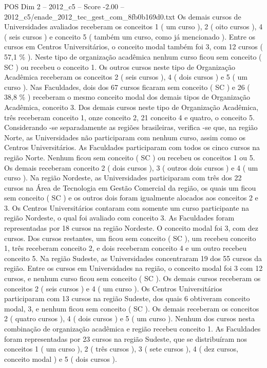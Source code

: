 \begin{textsample}{POS Dim 2 – 2012\_c5 – Score -2.00 – 2012\_c5/enade\_2012\_tec\_gest\_com\_8fb0b169d0.txt}
Os demais cursos de Universidades avaliados receberam os conceitos 1 ( um curso ), 2 ( oito cursos ), 4 ( seis cursos ) e conceito 5 ( também um curso, como já mencionado ).
Entre os cursos em Centros Universitários, o conceito modal também foi 3, com 12 cursos ( 57,1 \% ).
Neste tipo de organização acadêmica nenhum curso ficou sem conceito ( SC ) ou recebeu o conceito 1.
Os outros cursos neste tipo de Organização Acadêmica receberam os conceitos 2 ( seis cursos ), 4 ( dois cursos ) e 5 ( um curso ).
Nas Faculdades, dois dos 67 cursos ficaram sem conceito ( SC ) e 26 ( 38,8 \% ) receberam o mesmo conceito modal dos demais tipos de Organização Acadêmica, conceito 3.
Dos demais cursos neste tipo de Organização Acadêmica, três receberam conceito 1, onze conceito 2, 21 conceito 4 e quatro, o conceito 5.
Considerando -se separadamente as regiões brasileiras, verifica -se que, na região Norte, as Universidades não participaram com nenhum curso, assim como os Centros Universitários.
As Faculdades participaram com todos os cinco cursos na região Norte.
Nenhum ficou sem conceito ( SC ) ou recebeu os conceitos 1 ou 5.
Os demais receberam conceito 2 ( dois cursos ), 3 ( outros dois cursos ) e 4 ( um curso ).
Na região Nordeste, as Universidades participaram com três dos 22 cursos na Área de Tecnologia em Gestão Comercial da região, os quais um ficou sem conceito ( SC ) e os outros dois foram igualmente alocados aos conceitos 2 e 3.
Os Centros Universitários contaram com somente um curso participante na região Nordeste, o qual foi avaliado com conceito 3.
As Faculdades foram representadas por 18 cursos na região Nordeste.
O conceito modal foi 3, com dez cursos.
Dos cursos restantes, um ficou sem conceito ( SC ), um recebeu conceito 1, três receberam conceito 2, e dois receberam conceito 4 e um outro recebeu conceito 5.
Na região Sudeste, as Universidades concentraram 19 dos 55 cursos da região.
Entre os cursos em Universidades na região, o conceito modal foi 3 com 12 cursos, e nenhum curso ficou sem conceito ( SC ).
Os demais cursos receberam os conceitos 2 ( seis cursos ) e 4 ( um curso ).
Os Centros Universitários participaram com 13 cursos na região Sudeste, dos quais 6 obtiveram conceito modal, 3, e nenhum ficou sem conceito ( SC ).
Os demais receberam os conceitos 2 ( quatro cursos ), 4 ( dois cursos ) e 5 ( um curso ).
Nenhum dos cursos nesta combinação de organização acadêmica e região recebeu conceito 1.
As Faculdades foram representadas por 23 cursos na região Sudeste, que se distribuíram nos conceitos 1 ( um curso ), 2 ( três cursos ), 3 ( sete cursos ), 4 ( dez cursos, conceito modal ) e 5 ( dois cursos ).

\end{textsample}

